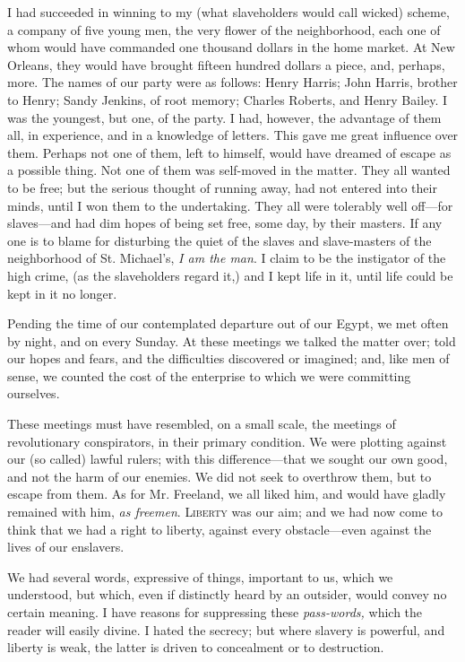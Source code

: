 I had succeeded in winning to my (what slaveholders would call wicked)
scheme, a company of five young men, the very flower of the
neighborhood, each one of whom would have commanded one thousand dollars
in the home market. At New Orleans, they would have brought fifteen
hundred dollars a piece, and, perhaps, more. The names of our party were
as follows: Henry Harris; John Harris, brother to Henry; Sandy Jenkins,
of root memory; Charles Roberts, and Henry Bailey. I was the youngest,
but one, of the party. I had, however, the advantage of them all, in
experience, and in a knowledge of letters. This gave me great influence
over them. Perhaps not one of them, left to himself, would have dreamed
of escape as a possible thing. Not one of them was self-moved in the
matter. They all wanted to be free; but the serious thought of running
away, had not entered into their minds, until I won them to the
undertaking. They all were tolerably well off---for slaves---and had dim
hopes of being set free, some day, by their masters. If any one is to
blame for disturbing the quiet of the slaves and slave-masters of the
neighborhood of St. Michael's, \emph{I am the man}.
{\protect\hypertarget{280}{}{}}I claim to be the instigator of the high
crime, (as the slaveholders regard it,) and I kept life in it, until
life could be kept in it no longer.

Pending the time of our contemplated departure out of our Egypt, we met
often by night, and on every Sunday. At these meetings we talked the
matter over; told our hopes and fears, and the difficulties discovered
or imagined; and, like men of sense, we counted the cost of the
enterprise to which we were committing ourselves.

These meetings must have resembled, on a small scale, the meetings of
revolutionary conspirators, in their primary condition. We were plotting
against our (so called) lawful rulers; with this difference---that we
sought our own good, and not the harm of our enemies. We did not seek to
overthrow them, but to escape from them. As for Mr. Freeland, we all
liked him, and would have gladly remained with him, \emph{as freemen}.
\textsc{Liberty} was our aim; and we had now come to think that we had a
right to liberty, against every obstacle---even against the lives of our
enslavers.

We had several words, expressive of things, important to us, which we
understood, but which, even if distinctly heard by an outsider, would
convey no certain meaning. I have reasons for suppressing these
\emph{pass-words,} which the reader will easily divine. I hated the
secrecy; but where slavery is powerful, and liberty is weak, the latter
is driven to concealment or to destruction.

